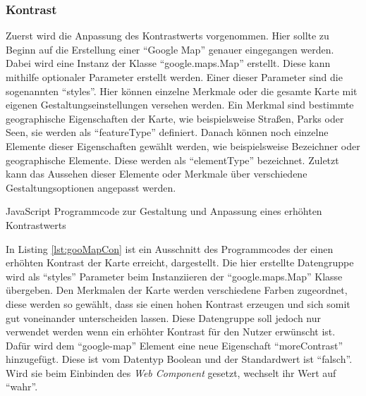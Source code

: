 \documentclass[12pt, paper=a4, bibtotoc, toc=listof, headsepline=true, numbers=endperiod]{scrreprt}
\begin{document}
	\subsubsection{Kontrast}
	Zuerst wird die Anpassung des Kontrastwerts vorgenommen. Hier sollte zu Beginn auf die Erstellung einer \enquote{Google Map} genauer eingegangen werden. Dabei wird eine Instanz der Klasse \enquote{google.maps.Map} erstellt. Diese kann mithilfe optionaler Parameter erstellt werden. Einer dieser Parameter sind die sogenannten \enquote{styles}. Hier können einzelne Merkmale oder die gesamte Karte mit eigenen Gestaltungseinstellungen versehen werden. Ein Merkmal sind bestimmte geographische Eigenschaften der Karte, wie beispielsweise Straßen, Parks oder Seen, sie werden als \enquote{featureType} definiert. Danach können noch einzelne Elemente dieser Eigenschaften gewählt werden, wie beispielsweise Bezeichner oder geographische Elemente. Diese werden als \enquote{elementType} bezeichnet. Zuletzt kann das Aussehen dieser Elemente oder Merkmale über verschiedene Gestaltungsoptionen angepasst werden\cite{gmapStyle}.
\begin{listing}[H]
		\caption[Anpassung zur Erhöhung des Kontrastwerts]{JavaScript Programmcode zur Gestaltung und Anpassung eines erhöhten Kontrastwerts}
		\label{lst:gooMapCon}
\end{listing}
In Listing \ref{lst:gooMapCon} ist ein Ausschnitt des Programmcodes der einen erhöhten Kontrast der Karte erreicht, dargestellt. Die hier erstellte Datengruppe wird als \enquote{styles} Parameter beim Instanziieren der \enquote{google.maps.Map} Klasse übergeben. Den Merkmalen der Karte werden verschiedene Farben zugeordnet, diese werden so gewählt, dass sie einen hohen Kontrast erzeugen und sich somit gut voneinander unterscheiden lassen. Diese Datengruppe soll jedoch nur verwendet werden wenn ein erhöhter Kontrast für den Nutzer erwünscht ist. Dafür wird dem \enquote{google-map} Element eine neue Eigenschaft \enquote{moreContrast} hinzugefügt. Diese ist vom Datentyp Boolean und der Standardwert ist \enquote{falsch}. Wird sie beim Einbinden des \emph{Web Component} gesetzt, wechselt ihr Wert auf \enquote{wahr}. 
\end{document}
